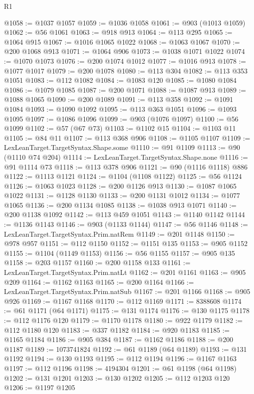 \begin{lexlean}{R1}
\begin{coremodule}
@1058 := @1037 @1057
@1059 := @1036 @1058
@1061 := @903 (@1013 @1059)
@1062 := @56 @1061
@1063 := @918 @913
@1064 := @113 @295
@1065 := @1064 @915
@1067 := @1016 @1065 @1022
@1068 := @1063 @1067
@1070 := @200 @1068 @913
@1071 := @1064 @906
@1073 := @1038 @1071 @1022
@1074 := @1070 @1073
@1076 := @200 @1074 @1012
@1077 := @1016 @913
@1078 := @1077 @1017
@1079 := @200 @1078
@1080 := @113 @304
@1082 := @113 @353 @1051
@1083 := @112 @1082
@1084 := @1083 @120
@1085 := @1080 @1084
@1086 := @1079 @1085
@1087 := @200 @1071
@1088 := @1087 @913
@1089 := @1088 @1065
@1090 := @200 @1089
@1091 := @113 @358
@1092 := @1091 @1084
@1093 := @1090 @1092
@1095 := @113 @363 @1051
@1096 := @1093 @1095
@1097 := @1086 @1096
@1099 := @903 (@1076 @1097)
@1100 := @56 @1099
@1102 := @57 (@67 @73)
@1103 := @1102 @15
@1104 := @1103 @11
@1105 := @84 @11
@1107 := @113 @368 @906
@1108 := @1105 @1107
@1109 := LexLeanTarget.TargetSyntax.Shape.some
@1110 := @91 @1109
@1113 := @90 (@1110 @74 @204)
@1114 := LexLeanTarget.TargetSyntax.Shape.none
@1116 := @91 @1114 @73
@1118 := @113 @378 @906
@1121 := @90 (@1116 @1118) @886
@1122 := @1113 @1121
@1124 := @1104 (@1108 @1122)
@1125 := @56 @1124
@1126 := @1063 @1023
@1128 := @200 @1126 @913
@1130 := @1087 @1065 @1022
@1131 := @1128 @1130
@1133 := @200 @1131 @1012
@1134 := @1077 @1065
@1136 := @200 @1134 @1085
@1138 := @1038 @913 @1071
@1140 := @200 @1138 @1092
@1142 := @113 @459 @1051
@1143 := @1140 @1142
@1144 := @1136 @1143
@1146 := @903 (@1133 @1144)
@1147 := @56 @1146
@1148 := LexLeanTarget.TargetSyntax.Prim.natRem
@1149 := @201 @1148
@1150 := @978 @957
@1151 := @112 @1150
@1152 := @1151 @135
@1153 := @905 @1152
@1155 := @1104 (@1149 @1153)
@1156 := @56 @1155
@1157 := @905 @135
@1158 := @203 @1157
@1160 := @200 @1158 @133
@1161 := LexLeanTarget.TargetSyntax.Prim.natLt
@1162 := @201 @1161
@1163 := @905 @209
@1164 := @1162 @1163
@1165 := @200 @1164
@1166 := LexLeanTarget.TargetSyntax.Prim.natSub
@1167 := @201 @1166
@1168 := @905 @926
@1169 := @1167 @1168
@1170 := @112 @1169
@1171 := 8388608
@1174 := @61 @1171 (@64 @1171)
@1175 := @131 @1174
@1176 := @130 @1175
@1178 := @112 @1176 @120
@1179 := @1170 @1178
@1180 := @922 @1179
@1182 := @112 @1180 @120
@1183 := @337 @1182
@1184 := @920 @1183
@1185 := @1165 @1184
@1186 := @905 @384
@1187 := @1162 @1186
@1188 := @200 @1187
@1189 := 1073741824
@1192 := @61 @1189 (@64 @1189)
@1193 := @131 @1192
@1194 := @130 @1193
@1195 := @112 @1194
@1196 := @1167 @1163
@1197 := @112 @1196
@1198 := 4194304
@1201 := @61 @1198 (@64 @1198)
@1202 := @131 @1201
@1203 := @130 @1202
@1205 := @112 @1203 @120
@1206 := @1197 @1205

\end{coremodule}
\end{lexlean}
